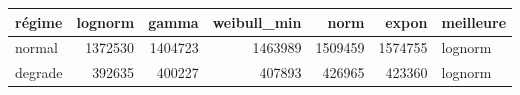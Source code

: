 \begin{tabular}{lrrrrrl}
\toprule
régime & lognorm & gamma & weibull\_min & norm & expon & meilleure \\
\midrule
normal & 1372530 & 1404723 & 1463989 & 1509459 & 1574755 & lognorm \\
degrade & 392635 & 400227 & 407893 & 426965 & 423360 & lognorm \\
\bottomrule
\end{tabular}
